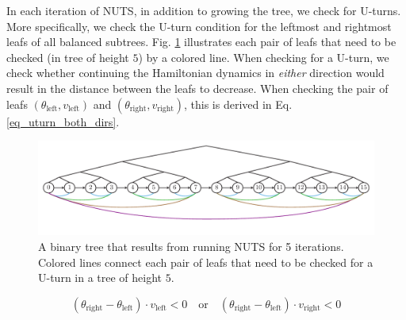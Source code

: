 \documentclass[12pt]{article}
\begin{document}
{In each iteration of NUTS, in addition to growing the tree, we check for U-turns. More specifically, we check the U-turn condition for the leftmost and rightmost leafs of all balanced subtrees. Fig. \ref{fig_nuts_uturn_leafs} illustrates each pair of leafs that need to be checked (in tree of height $5$) by a colored line. When checking for a U-turn, we check whether continuing the Hamiltonian dynamics in \textit{either} direction would result in the distance between the leafs to decrease. When checking the pair of leafs $(\theta_\text{left}, v_\text{left})$ and $(\theta_\text{right}, v_\text{right})$, this is derived in Eq. \ref{eq_uturn_both_dirs}.

\begin{figure}[ht]
\centering
\includegraphics[width=16cm]{illustrations/nuts_uturn_leafs.pdf}
\caption{A binary tree that results from running NUTS for 5 iterations. Colored  lines connect each pair of leafs that need to be checked for a U-turn in a tree of height $5$.}
\label{fig_nuts_uturn_leafs}
\end{figure}

\begin{equation}
(\theta_\text{right} - \theta_\text{left}) \cdot v_\text{left} < 0
\quad \text{or} \quad
(\theta_\text{right} - \theta_\text{left}) \cdot v_\text{right} < 0
\label{eq_uturn_both_dirs}
\end{equation}

}
\end{document}
